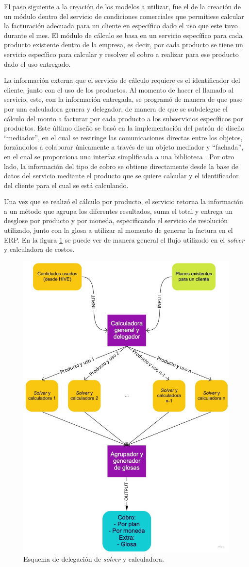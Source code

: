     El paso siguiente a la creación de los modelos a utilizar, fue el de la creación de un módulo dentro del servicio de condiciones comerciales  que permitiese calcular la facturación adecuada para un cliente en específico dado el uso que este tuvo durante el mes. El módulo de cálculo se basa en un servicio específico para cada producto existente dentro de la empresa, es decir, por cada producto se tiene un servicio específico para calcular y resolver el cobro a realizar para ese producto dado el uso entregado.

    La información externa que el servicio de cálculo requiere es el identificador del cliente, junto con el uso de los productos. Al momento de hacer el llamado al servicio, este, con la información entregada, se programó de manera de que pase por una calculadora genera y delegador, de manera de que se subdelegue el cálculo del monto a facturar por cada producto a los subservicios específicos por productos. Este último diseño se basó en la implementación del patrón de diseño ``mediador'', en el cual se restringe las comunicaciones directas entre los objetos, forzándolos a colaborar únicamente a través de un objeto mediador \cite{pattern_mediator} y ``fachada'', en el cual se proporciona una interfaz simplificada a una biblioteca \cite{pattern_facade}. Por otro lado, la información del tipo de cobro se obtiene directamente desde la base de datos del servicio mediante el producto que se quiere calcular y el identificador del cliente para el cual se está calculando.
    
    Una vez que se realizó el cálculo por producto, el servicio retorna la información a un método que agrupa los diferentes resultados, suma el total y entrega un desglose por producto y por moneda, especificando el servicio de resolución utilizado, junto con la glosa a utilizar al momento de generar la factura en el ERP. En la figura \ref{fig:cc_calculator} se puede ver de manera general el flujo utilizado en el \textit{solver} y calculadora de costos.

    \begin{figure}
      \centering
      \includegraphics[width=0.5\linewidth]{figures/cc/cc_calculator.jpg}
      \caption{Esquema de delegación de \textit{solver} y calculadora.}
      \label{fig:cc_calculator}
    \end{figure}


